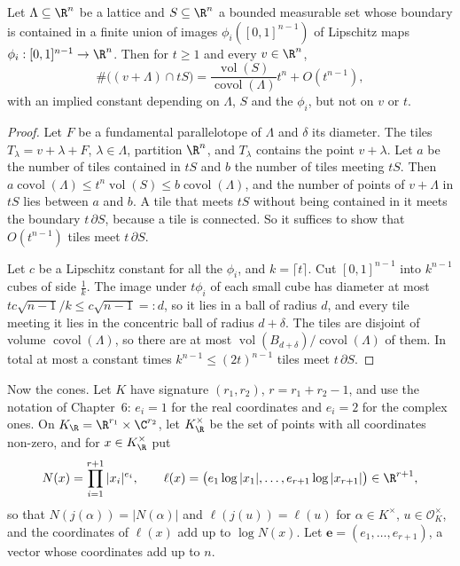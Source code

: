 \begin{lemma}\label{lem:lipschitz}
Let $\Lambda\subseteq\R^n$ be a lattice and $S\subseteq\R^n$ a bounded measurable set whose boundary is contained in a finite
union of images $\phi_i([0,1]^{n-1})$ of Lipschitz maps $\phi_i:[0,1]^{n-1}\to\R^n$. Then for $t\ge1$ and every $v\in\R^n$,
\[
\#\bigl((v+\Lambda)\cap tS\bigr)=\frac{\operatorname{vol}(S)}{\operatorname{covol}(\Lambda)}t^n+O(t^{n-1}),
\]
with an implied constant depending on $\Lambda$, $S$ and the $\phi_i$, but not on $v$ or $t$.
\end{lemma}
\begin{proof}
Let $F$ be a fundamental parallelotope of $\Lambda$ and $\delta$ its diameter. The tiles $T_\lambda=v+\lambda+F$, $\lambda\in\Lambda$,
partition $\R^n$, and $T_\lambda$ contains the point $v+\lambda$. Let $a$ be the number of tiles contained in $tS$ and $b$ the
number of tiles meeting $tS$. Then $a\operatorname{covol}(\Lambda)\le t^n\operatorname{vol}(S)\le b\operatorname{covol}(\Lambda)$,
and the number of points of $v+\Lambda$ in $tS$ lies between $a$ and $b$. A tile that meets $tS$ without being contained in it
meets the boundary $t\,\partial S$, because a tile is connected. So it suffices to show that $O(t^{n-1})$ tiles meet $t\,\partial S$.

Let $c$ be a Lipschitz constant for all the $\phi_i$, and $k=\lceil t\rceil$. Cut $[0,1]^{n-1}$ into $k^{n-1}$ cubes of side $\frac1k$.
The image under $t\phi_i$ of each small cube has diameter at most $tc\sqrt{n-1}/k\le c\sqrt{n-1}=:d$, so it lies in a ball of
radius $d$, and every tile meeting it lies in the concentric ball of radius $d+\delta$. The tiles are disjoint of volume
$\operatorname{covol}(\Lambda)$, so there are at most $\operatorname{vol}(B_{d+\delta})/\operatorname{covol}(\Lambda)$ of them. In
total at most a constant times $k^{n-1}\le(2t)^{n-1}$ tiles meet $t\,\partial S$.
\end{proof}

Now the cones. Let $K$ have signature $(r_1,r_2)$, $r=r_1+r_2-1$, and use the notation of Chapter~6: $e_i=1$ for the real
coordinates and $e_i=2$ for the complex ones. On $K_\R=\R^{r_1}\times\C^{r_2}$, let $K_\R^\times$ be the set of points with all
coordinates non-zero, and for $x\in K_\R^\times$ put
\[
N(x)=\prod_{i=1}^{r+1}|x_i|^{e_i},\qquad \ell(x)=\bigl(e_1\log|x_1|,\dots,e_{r+1}\log|x_{r+1}|\bigr)\in\R^{r+1},
\]
so that $N(j(\alpha))=|N(\alpha)|$ and $\ell(j(u))=\ell(u)$ for $\alpha\in K^\times$, $u\in\mathcal O_K^\times$, and the coordinates of
$\ell(x)$ add up to $\log N(x)$. Let $\mathbf e=(e_1,\dots,e_{r+1})$, a vector whose coordinates add up to $n$.

